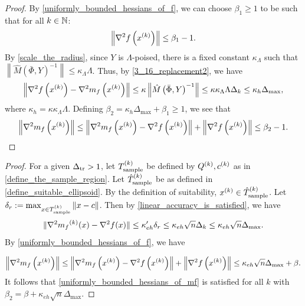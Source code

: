\documentclass{article}
\let\oldref\ref
\renewcommand{\ref}[1]{(\oldref{#1})}
\begin{document}
\begin{proof}

By \cref{uniformly_bounded_hessians_of_f}, we can choose $\beta_1 \ge 1$ to be such that for all $k \in\mathbb N$:
\begin{align*}
\left\|\nabla^2 f\left(x^{(k)}\right) \right\| \le \beta_1 - 1.
\end{align*}
By \cref{scale_the_radius}, since $Y$  is $\Lambda$-poised,  there is a fixed constant $\kappa_{\Lambda}$ such that $\left\|\hat M\left(\bar \Phi, Y\right)^{-1}\right\| \le \kappa_{\Lambda} \Lambda$.  Thus, by \cref{3_16_replacement2},  we have
\begin{align*}
\left\|\nabla^2 f\left(x^{(k)}\right) - \nabla^2 m_f\left(x^{(k)}\right) \right\| \le \kappa \left\|\hat M\left(\bar \Phi, Y\right)^{-1}\right\| \le \kappa \kappa_{\Lambda} \Lambda \Delta_k \le \kappa_{h} \Delta_{\text{max}},
\end{align*}
where $\kappa_{h} = \kappa \kappa_{\Lambda} \Lambda$.
Defining $\beta_2 = \kappa_{h} \Delta_{\text{max}} + \beta_1 \ge 1$, we see that
\begin{align*}
\left\|\nabla^2 m_{f}\left(x^{(k)}\right)\right\| \le \left\|\nabla^2 m_{f}\left(x^{(k)}\right) - \nabla^2 f\left(x^{(k)}\right)  \right\| + \left\|\nabla^2 f\left(x^{(k)}\right) \right\|
\le \beta_2 - 1 .
\end{align*}
\end{proof}



\begin{proof}
For a given $\Delta_{\textrm{tr}} > 1$, let ${T_{\text{sample}}^{(k)}}$ be defined by ${Q^{(k)}}, c^{(k)}$ as in \cref{define_the_sample_region}.  Let ${\hat{T}_{\text{sample}}^{(k)}}$ be as defined in \cref{define_suitable_ellipsoid}.    By the definition of suitability, $x^{(k)} \in {\hat{T}_{\text{sample}}^{(k)}}$.  Let $\delta_r := \max_{x \in {T_{\text{sample}}^{(k)}}} \left\| x-c \right\|$.    Then by 
\cref{linear_accuracy_is_satisfied}, we have  
\[\|\nabla^2 {{m}_f}^{(k)}(x) - \nabla^2 f(x)\| \le \kappa_{eh}'\delta_r \le \kappa_{eh} \sqrt{n} \Delta_k \le \kappa_{eh}\sqrt{n}\Delta_{\text{max}}.\]
By \cref{uniformly_bounded_hessians_of_f},  we have

\begin{align*}
\left\|\nabla^2 m_{f}\left(x^{(k)}\right)\right\| \le \left\|\nabla^2 m_{f}\left(x^{(k)}\right) - \nabla^2 f\left(x^{(k)}\right)  \right\| + \left\|\nabla^2 f\left(x^{(k)}\right) \right\|
\le \kappa_{eh}\sqrt{n}\Delta_{\text{max}} + \beta .
\end{align*}
It follows that \cref{uniformly_bounded_hessians_of_mf} is satisfied for all $k$ with $\beta_2 = \beta+\kappa_{eh}\sqrt{n}\Delta_{\text{max}}$.
\end{proof}
\end{document}
